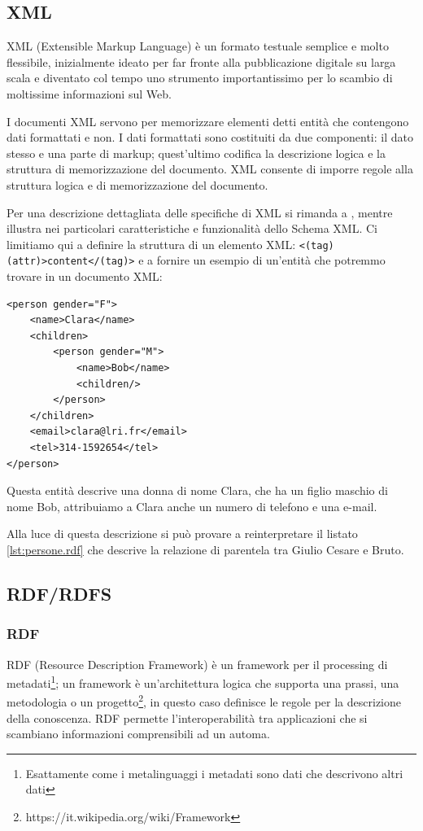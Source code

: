 \subsection{XML}
XML (Extensible Markup Language) è un formato testuale semplice e molto flessibile, inizialmente ideato per far fronte alla pubblicazione digitale su larga scala e diventato col tempo uno strumento importantissimo per lo scambio di moltissime informazioni sul Web\cite{w3cXml}.

I documenti XML servono per memorizzare elementi detti entità che contengono dati formattati e non. I dati formattati sono costituiti da due componenti: il dato stesso e una parte di markup; quest'ultimo codifica la descrizione logica e la struttura di memorizzazione del documento. XML consente di imporre regole alla struttura logica e di memorizzazione del documento\cite{world2006extensible}.

Per una descrizione dettagliata delle specifiche di XML si rimanda a \cite{world2006extensible}, mentre \cite{li2005testing} illustra nei particolari caratteristiche e funzionalità dello Schema XML. Ci limitiamo qui a definire la struttura di un elemento XML: \verb|<(tag) (attr)>content</(tag)>| e a fornire un esempio di un'entità che potremmo trovare in un documento XML:
\begin{verbatim}
<person gender="F">
	<name>Clara</name>
	<children>
		<person gender="M">
			<name>Bob</name>
			<children/>
		</person>
	</children>
	<email>clara@lri.fr</email>
	<tel>314-1592654</tel>
</person>
\end{verbatim}
Questa entità descrive una donna di nome Clara, che ha un figlio maschio di nome Bob, attribuiamo a Clara anche un numero di telefono e una e-mail.

Alla luce di questa descrizione si può provare a reinterpretare il listato \ref{lst:persone.rdf} che descrive la relazione di parentela tra Giulio Cesare e Bruto.
\subsection{RDF/RDFS}
\subsubsection{RDF}
RDF (Resource Description Framework) è un framework per il processing di metadati\footnote{Esattamente come i metalinguaggi i metadati sono dati che descrivono altri dati}; un framework è un'architettura logica che supporta una prassi, una metodologia o un progetto\footnote{https://it.wikipedia.org/wiki/Framework}, in questo caso definisce le regole per la descrizione della conoscenza. RDF permette l'interoperabilità tra applicazioni che si scambiano informazioni comprensibili ad un automa.

